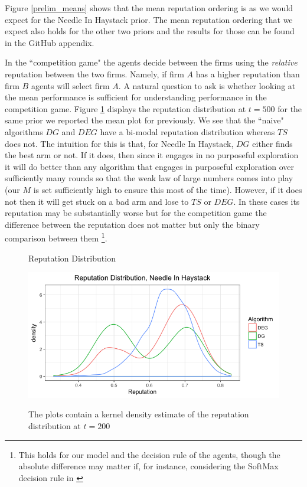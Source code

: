 \documentclass{article}
\theoremstyle{definition}
\begin{document}
Figure \ref{prelim_means} shows that the mean reputation ordering is as we would expect for the Needle In Haystack prior. The mean reputation ordering that we expect also holds for the other two priors and the results for those can be found in the GitHub appendix.

In the ``competition game" the agents decide between the firms using the \textit{relative} reputation between the two firms. Namely, if firm $A$ has a higher reputation than firm $B$ agents will select firm $A$. A natural question to ask is whether looking at the mean performance is sufficient for understanding performance in the competition game. Figure \ref{rep_dist_nih} displays the reputation distribution at $t = 500$ for the same prior we reported the mean plot for previously. We see that the ``naive" algorithms $DG$ and $DEG$ have a bi-modal reputation distribution whereas $TS$ does not. The intuition for this is that, for Needle In Haystack, $DG$ either finds the best arm or not. If it does, then since it engages in no purposeful exploration it will do better than any algorithm that engages in purposeful exploration over sufficiently many rounds so that the weak law of large numbers comes into play (our $M$ is set sufficiently high to ensure this most of the time). However, if it does not then it will get stuck on a bad arm and lose to $TS$ or $DEG$. In these cases its reputation may be substantially worse but for the competition game the difference between the reputation does not matter but only the binary comparison between them \footnote{This holds for our model and the decision rule of the agents, though the absolute difference may matter if, for instance, considering the SoftMax decision rule in \citet{mansour2018competing}}.

\begin{figure}
\caption{Reputation Distribution}
\includegraphics[scale=0.35]{figures/rep_distribution_nih}
\label{rep_dist_nih}
\caption*{\tiny{The plots contain a kernel density estimate of the reputation distribution at $t = 200$}}
\end{figure}
\end{document}
